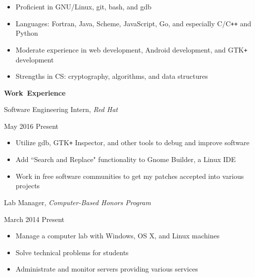 \documentclass[11pt]{article}
\begin{document}
\begin{itemize}
  \item Proficient in GNU/Linux, git, bash, and gdb
  \item Languages: Fortran, Java, Scheme, JavaScript, Go, and especially C/C\texttt{++} and Python
  \item Moderate experience in web development, Android development, and GTK\texttt{+} development
  \item Strengths in CS: cryptography, algorithms, and data structures
\end{itemize}

\vspace{0.8em}
\hbox{\large \textbf{Work Experience}}

\begin{minipage}[t]{0.65\textwidth}
\flushleft
Software Engineering Intern, \textit{Red Hat}\\
\end{minipage}
\begin{minipage}[t]{0.30\textwidth}
\flushright
May 2016 \space \textemdash \space Present\\
\end{minipage}

\begin{itemize}
  \item Utilize gdb, GTK\texttt{+} Inspector, and other tools to debug and improve software
  \item Add ``Search and Replace" functionality to Gnome Builder, a Linux IDE
  \item Work in free software communities to get my patches accepted into various projects
\end{itemize}

\begin{minipage}[t]{0.65\textwidth}
\flushleft
Lab Manager, \textit{Computer-Based Honors Program}\\
\end{minipage}
\begin{minipage}[t]{0.30\textwidth}
\flushright
March 2014 \space \textemdash \space Present\\
\end{minipage}

\begin{itemize}
  \item Manage a computer lab with Windows, OS X, and Linux machines
  \item Solve technical problems for students
  \item Administrate and monitor servers providing various services
\end{itemize}
\end{document}
